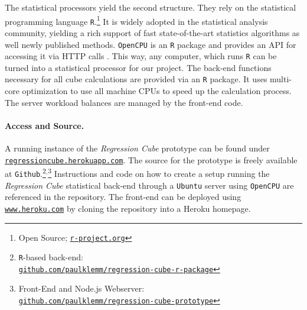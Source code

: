 \documentclass[journal]{style/vgtc} 			          %
\newcommand{\com}[1]{\textcolor{orange}{\uline{#1}}}
\begin{document}
The statistical processors yield the second structure.
They rely on the statistical programming language \texttt{R}.\footnote{Open Source; \href{http://r-project.org}{\texttt{r-project.org}}}
It is widely adopted in the statistical analysis community, yielding a rich support of fast state-of-the-art statistics algorithms as well newly published methods.
\texttt{OpenCPU} is an \texttt{R} package and provides an API for accessing it via HTTP calls \cite{Ooms}.
This way, any computer, which runs \texttt{R} can be turned into a statistical processor for our project.
The back-end functions necessary for all cube calculations are provided via an \texttt{R} package.
It uses multi-core optimization to use all machine CPUs to speed up the calculation process.
The server workload balances are managed by the front-end code.

\paragraph{Access and Source.}
A running instance of the \emph{Regression Cube} prototype can be found under \href{http://regressioncube.herokuapp.com/}{\texttt{regressioncube.herokuapp.com}}.
The source for the prototype is freely available at \texttt{Github}.\footnote{\texttt{R}-based back-end: \href{https://github.com/paulklemm/regression-cube-r-package}{\\\texttt{github.com/paulklemm/regression-cube-r-package}}}$^{,}$\footnote{Front-End and Node.js Webserver: \href{https://github.com/paulklemm/regression-cube-prototype}{\texttt{\\github.com/paulklemm/regression-cube-prototype}}}
Instructions and code on how to create a setup running the \emph{Regression Cube} statistical back-end through a \texttt{Ubuntu} server using \texttt{OpenCPU} are referenced in the repository.
The front-end can be deployed using \href{https://www.heroku.com/}{\texttt{www.heroku.com}} by cloning the repository into a Heroku homepage.
\end{document}
